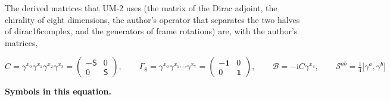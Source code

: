 \documentclass[
  10pt,
]{article}
\begin{document}
The derived matrices that UM-2 uses (the matrix of the Dirac adjoint,
the chirality of eight dimensions, the author's operator that separates
the two halves of dirac16complex, and the generators of frame rotations)
are, with the author's matrices,

\[
C = \gamma^{x_0}\gamma^{x_1}\gamma^{x_2}\gamma^{x_3} = \begin{pmatrix}-\mathsf{S} & 0\\ 0 & \mathsf{S}\end{pmatrix},\qquad
\Gamma_8 = \gamma^{x_0}\gamma^{x_1}\cdots\gamma^{x_7} = \begin{pmatrix}-\mathbf{1} & 0\\ 0 & \mathbf{1}\end{pmatrix},\qquad
\mathcal{B} = -\mathrm{i}C\gamma^{x_4},\qquad \mathcal{S}^{ab} = \tfrac14\big[\gamma^a, \gamma^b\big]
\]

\textbf{Symbols in this equation.}
\end{document}
